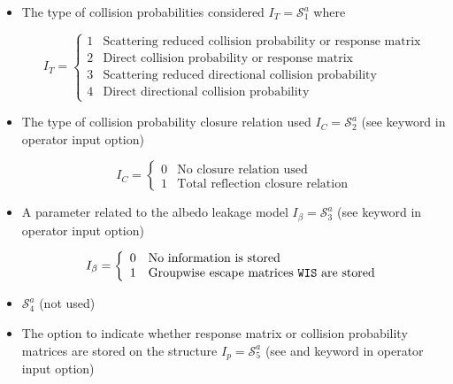 \begin{itemize}
\item The type of collision probabilities considered $I_{T}=\mathcal{S}^{a}_{1}$ where

\begin{displaymath}
I_{T} = \left\{
\begin{array}{rl}
 1 & \textrm{Scattering reduced collision probability or response matrix}\\
 2 & \textrm{Direct collision probability or response matrix} \\ 
 3 & \textrm{Scattering reduced directional collision probability} \\ 
 4 & \textrm{Direct directional collision probability}  
\end{array} \right.
\end{displaymath}

\item The type of collision probability closure relation used $I_{C}=\mathcal{S}^{a}_{2}$
(see  keyword in  operator input option)

\begin{displaymath}
I_{C} = \left\{
\begin{array}{rl}
 0 & \textrm{No closure relation used} \\
 1 & \textrm{Total reflection closure relation} 
\end{array} \right.
\end{displaymath}

\item A parameter related to the albedo leakage model $I_{\beta}=\mathcal{S}^{a}_{3}$
(see  keyword in  operator input option)

\begin{displaymath}
I_{\beta} = \left\{
\begin{array}{rl}
 0 & \textrm{No information is stored} \\
 1 & \textrm{Groupwise escape matrices \moc{WIS} are stored} 
\end{array} \right.
\end{displaymath}

\item $\mathcal{S}^{a}_{4}$ (not used)

\item The option to indicate whether response matrix or collision probability matrices are stored
on the structure $I_{p}=\mathcal{S}^{a}_{5}$ (see  and 
keyword in  operator input option)


\end{itemize}
